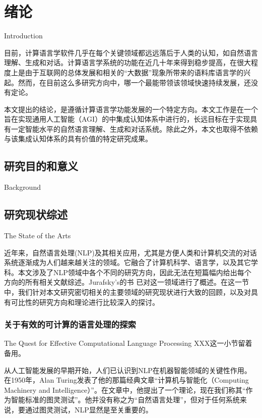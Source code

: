 \chapter{绪论}{Introduction}
\label{chap:intro}


目前，计算语言学软件几乎在每个关键领域都远远落后于人类的认知，如自然语言理解、生成和对话。计算语言学系统的功能在近几十年来得到稳步提高，在很大程度上是由于互联网的总体发展和相关的“大数据”现象所带来的语料库语言学的兴起。然而，在目前这么多研究方向中，哪一个最能带领该领域快速持续发展，还没有定论。

本文提出的结论，是遵循计算语言学功能发展的一个特定方向。本文工作是在一个旨在实现通用人工智能（AGI）的中集成认知体系中进行的，长远目标在于实现具有一定智能水平的自然语言理解、生成和对话系统。除此之外，本文也取得不依赖与该集成认知体系的具有价值的特定研究成果。

\section{研究目的和意义}{Background}

\section{研究现状综述}{The State of the Arts}

近年来，自然语言处理(NLP)及其相关应用，尤其是方便人类和计算机交流的对话系统逐渐成为人们越来越关注的领域。它融合了计算机科学、语言学，以及其它学科。本文涉及了NLP领域中各个不同的研究方向，因此无法在短篇幅内给出每个方向的所有相关文献综述。Jurafsky’s的书 \cite{Jurafsky2009}已对这一领域进行了概述。在这一节中，我们针对本文研究密切相关的主要领域的研究现状进行大致的回顾，以及对具有可比性的研究方向和理论进行比较深入的探讨。

\subsection{关于有效的可计算的语言处理的探索}{The Quest for Effective Computational Language Processing}
XXX这一小节留着备用。

      从人工智能发展的早期开始，人们已认识到NLP在机器智能领域的关键性作用。在1950年，Alan Turing发表了他的那篇经典文章“计算机与智能化（Computing  Machinery and Intelligence）”。在文章中，他提出了一个理论，现在我们称其“作为智能标准的图灵测试”。他并没有称之为“自然语言处理”，但对于任何系统来说，要通过图灵测试，NLP显然是至关重要的。

